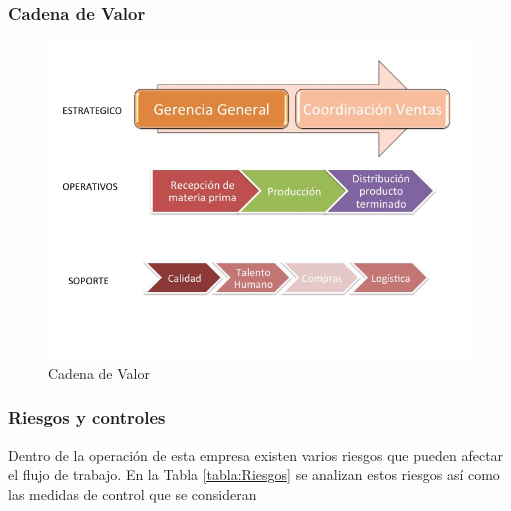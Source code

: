 \documentclass[12pt, a4paper]{article}
\begin{document}
\subsubsection{Cadena de Valor}
\begin{figure}[H]
  \centering
  
    \includegraphics[width=1.1\textwidth]{CadenadeValor.jpg}
  \captionsetup{justification=centering} %
  \caption{Cadena de Valor}
  \label{figura:2}
\end{figure}

\subsubsection{Riesgos y controles}
Dentro de la operación de esta empresa existen varios riesgos que pueden afectar el flujo de trabajo. En la Tabla \ref{tabla:Riesgos} se analizan estos riesgos así como las medidas de control que se consideran
\end{document}
